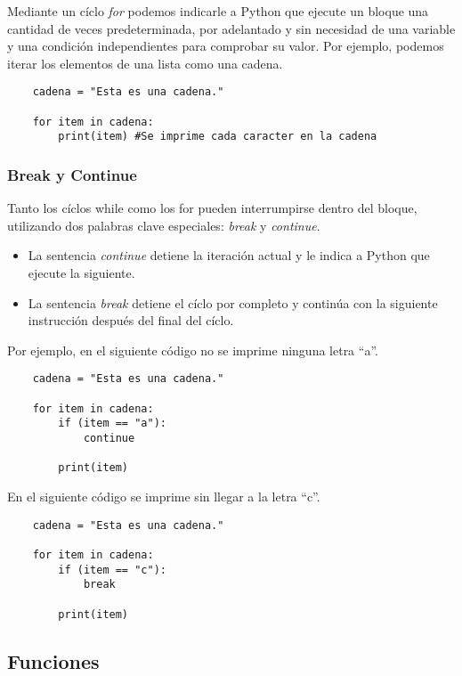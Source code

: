 \documentclass[12pt]{article}
\theoremstyle{definition}
\begin{document}
    Mediante un cíclo \textit{for} podemos indicarle a Python que ejecute un bloque una cantidad de veces predeterminada,
    por adelantado y sin necesidad de una variable y una condición independientes para comprobar su valor.
    Por ejemplo, podemos iterar los elementos de una lista como una cadena.

    \begin{lstlisting}
    cadena = "Esta es una cadena."

    for item in cadena:
        print(item) #Se imprime cada caracter en la cadena
    \end{lstlisting}

    \subsubsection{Break y Continue}

    Tanto los cíclos while como los for pueden interrumpirse dentro del bloque, utilizando dos palabras clave especiales: \textit{break} y \textit{continue}.
    \begin{itemize}
        \item La sentencia \textit{continue} detiene la iteración actual y le indica a Python que ejecute la siguiente.
        \item La sentencia \textit{break} detiene el cíclo por completo y continúa con la siguiente instrucción después del final del cíclo.
    \end{itemize}

    Por ejemplo, en el siguiente código no se imprime ninguna letra ``a''.
    \begin{lstlisting}
    cadena = "Esta es una cadena."

    for item in cadena:
        if (item == "a"):
            continue

        print(item)
    \end{lstlisting}

    En el siguiente código se imprime sin llegar a la letra ``c''.
    \begin{lstlisting}
    cadena = "Esta es una cadena."

    for item in cadena:
        if (item == "c"):
            break

        print(item)
    \end{lstlisting}


    \subsection{Funciones}
\end{document}
